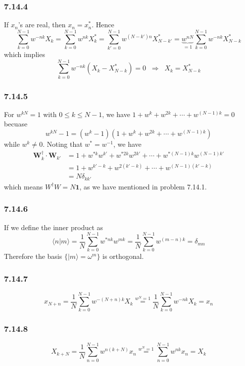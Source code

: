 \documentclass[]{ctexart}
\begin{document}
\subsubsection*{7.14.4}
If $x_n$'s are real, then $x_n=x_n^*$. Hence 
\begin{equation*}
\sum_{k=0}^{N-1}w^{-nk}X_k=\sum_{k=0}^{N-1}w^{nk}X_k^*=\sum_{k'=0}^{N-1}w^{(N-k')n}X_{N-k'}^*=\underbrace{w^{nN}}_{=1}\sum_{k=0}^{N-1}w^{-nk}X_{N-k}^*
\end{equation*}
which implies 
\begin{equation*}
\sum_{k=0}^{N-1}w^{-nk}(X_k-X_{N-k}^*)=0\;\;\Rightarrow\;\;X_k=X_{N-k}^*
\end{equation*}
\subsubsection*{7.14.5}
For $w^{kN}=1$ with $0\le k\le N-1$, we have $1+w^{k}+w^{2k}+\cdots+w^{(N-1)k}=0$ becuase 
\begin{equation*}
w^{kN}-1=(w^k-1)(1+w^{k}+w^{2k}+\cdots+w^{(N-1)k})
\end{equation*}
while $w^k\ne 0$. Noting that $w^*=w^{-1}$, we have 
\begin{align*}
\mathbf W_k^\dagger\cdot\mathbf W_{k'}&=1+w^{*k} w^{k'}+w^{*2k}w^{2k'}+\cdots +w^{*(N-1)k}w^{(N-1)k'}\\
&=1+w^{k'-k}+w^{2(k'-k)}+\cdots+w^{(N-1)(k'-k)}\\
&=N\delta_{kk'}
\end{align*}
which means $W^\dagger W=N\mathbf 1$, as we have mentioned in problem 7.14.1. 
\subsubsection*{7.14.6}
If we define the inner product as 
\begin{equation*}
\langle n|m\rangle=\frac{1}{N}\sum_{k=0}^{N-1}w^{*nk}w^{mk}=\frac{1}{N}\sum_{k=0}^{N-1}w^{(m-n)k}=\delta_{mn}
\end{equation*}
Therefore the basis $\{|m\rangle=\omega^m\}$ is orthogonal. 
\subsubsection*{7.14.7}
\begin{equation*}
x_{N+n}=\frac{1}{N}\sum_{k=0}^{N-1}w^{-(N+n)k}X_k\overset{w^N=1}{=}\frac{1}{N}\sum_{k=0}^{N-1}w^{-nk}X_k=x_n
\end{equation*}
\subsubsection*{7.14.8}
\begin{equation*}
X_{k+N}=\frac{1}{N}\sum_{n=0}^{N-1}w^{n(k+N)}x_n\overset{w^N=1}{=}\sum_{n=0}^{N-1}w^{nk}x_n=X_k
\end{equation*}
\end{document}
